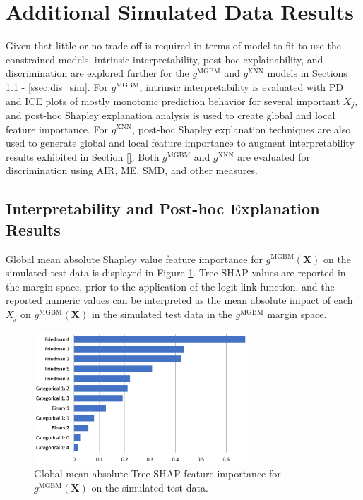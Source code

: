 \documentclass[information,article,submit,moreauthors,pdftex]{definitions/mdpi}
\begin{document}
\section{Additional Simulated Data Results}\label{a_sec:res_sim}

Given that little or no trade-off is required in terms of model to fit to use the constrained models, intrinsic interpretability, post-hoc explainability, and discrimination are explored further for the $g^\text{MGBM}$ and $g^\text{XNN}$ models in Sections \ref{ssec:int_ex_sim} - \ref{ssec:dis_sim}. For $g^\text{MGBM}$, intrinsic interpretability is evaluated with PD and ICE plots of mostly monotonic prediction behavior for several important $X_j$, and post-hoc Shapley explanation analysis is used to create global and local feature importance. For $g^\text{XNN}$, post-hoc Shapley explanation techniques are also used to generate global and local feature importance to augment interpretability results exhibited in Section \ref{}. Both $g^\text{MGBM}$ and $g^\text{XNN}$ are evaluated for discrimination using AIR, ME, SMD, and other measures.

\subsection{Interpretability and Post-hoc Explanation Results}\label{ssec:int_ex_sim}

Global mean absolute Shapley value feature importance for $g^{\text{MGBM}}(\mathbf{X})$ on the simulated test data is displayed in Figure \ref{fig:sim_mgbm_glob}. Tree SHAP values are reported in the margin space, prior to the application of the logit link function, and the reported numeric values can be interpreted as the mean absolute impact of each $X_j$ on $g^\text{MGBM}(\mathbf{X})$ in the simulated test data in the $g^\text{MGBM}$ margin space. 

\begin{figure}[H]
	\centering
	\includegraphics[width=8cm]{img/sim_mgbm_glob.png}
	\caption{Global mean absolute Tree SHAP feature importance for $g^\text{MGBM}(\mathbf{X})$ on the simulated test data.}
	\label{fig:sim_mgbm_glob}
\end{figure}  
\end{document}
